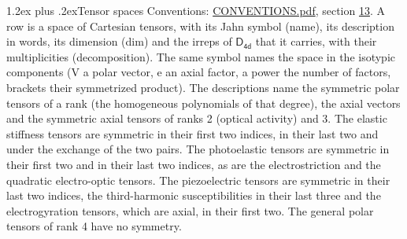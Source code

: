 \documentclass[10pt,a4paper]{article}
\makeatletter
\renewcommand\section{\@startsection{section}{1}{\z@}{-3ex plus -1ex minus -.2ex}%
  {1.2ex plus .2ex}{\normalfont\large\sffamily\bfseries\color{parttitle}}}
\numberwithin{equation}{section}
\newcommand{\grp}[1]{\mathsf{#1}}
\makeatother
\begin{document}
\section{Tensor spaces}\label{s:tensor_spaces}
Conventions: \href{../../CONVENTIONS.pdf}{CONVENTIONS.pdf}, section \href{../../CONVENTIONS.pdf\#conv.13}{13}.
\leavevmode\label{n:head.name}\label{n:head.description}\label{n:head.dim}\label{n:head.decomposition}A row is a space of Cartesian tensors, with its Jahn symbol (name), its description in words, its dimension (dim) and the irreps of $\grp{D_{4d}}$ that it carries, with their multiplicities (decomposition). \label{n:label.jahn}The same symbol names the space in the isotypic components (V a polar vector, e an axial factor, a power the number of factors, brackets their symmetrized product). The descriptions name the symmetric polar tensors of a rank (the homogeneous polynomials of that degree), the axial vectors and the symmetric axial tensors of ranks 2 (optical activity) and 3. The elastic stiffness tensors are symmetric in their first two indices, in their last two and under the exchange of the two pairs. The photoelastic tensors are symmetric in their first two and in their last two indices, as are the electrostriction and the quadratic electro-optic tensors. The piezoelectric tensors are symmetric in their last two indices, the third-harmonic susceptibilities in their last three and the electrogyration tensors, which are axial, in their first two. The general polar tensors of rank 4 have no symmetry.
\end{document}
